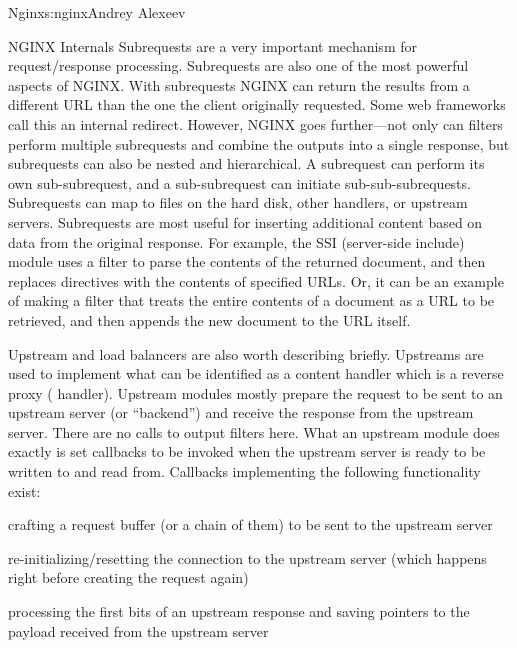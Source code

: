 \begin{aosachapter}{Nginx}{s:nginx}{Andrey Alexeev}
\begin{aosasect1}{NGINX Internals}
Subrequests are a very important mechanism for request/response
processing. Subrequests are also one of the most powerful aspects of
NGINX. With subrequests NGINX can return the results from a different
URL than the one the client originally requested. Some web frameworks
call this an internal redirect. However, NGINX goes further---not only
can filters perform multiple subrequests and combine the outputs into
a single response, but subrequests can also be nested and
hierarchical. A subrequest can perform its own sub-subrequest, and a
sub-subrequest can initiate sub-sub-subrequests. Subrequests can map
to files on the hard disk, other handlers, or upstream
servers. Subrequests are most useful for inserting additional content
based on data from the original response. For example, the SSI
(server-side include) module uses a filter to parse the contents of
the returned document, and then replaces  directives
with the contents of specified URLs. Or, it can be an example of making
a filter that treats the entire contents of a document as a URL to be
retrieved, and then appends the new document to the URL itself.


Upstream and load balancers are also worth describing
briefly. Upstreams are used to implement what can be identified as a
content handler which is a reverse proxy (
handler). %
Upstream modules mostly prepare the request to be sent to an upstream
server (or ``backend'') and receive the response from the upstream
server. There are no calls to output filters here. What an upstream
module does exactly is set callbacks to be invoked when the upstream
server is ready to be written to and read from. Callbacks implementing
the following functionality exist:

\begin{aosaitemize}

\item crafting a request buffer (or a chain of them) to be sent to the
  upstream server

\item re-initializing/resetting the connection to the upstream server
  (which happens right before creating the request again)

\item processing the first bits of an upstream response and saving
  pointers to the payload received from the upstream server


\end{aosaitemize}
\end{aosasect1}
\end{aosachapter}
